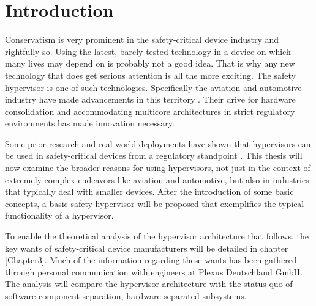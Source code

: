
\chapter{Introduction} %

\label{Chapter1} %


\newcommand{\keyword}[1]{\textbf{#1}}
\newcommand{\bold}[1]{\textbf{#1}}
\newcommand{\tabhead}[1]{\textbf{#1}}
\newcommand{\code}[1]{\texttt{#1}}
\newcommand{\file}[1]{\texttt{\bfseries#1}}
\newcommand{\option}[1]{\texttt{\itshape#1}}

\newcommand{\mfg}{manufacturer}

Conservatism is very prominent in the safety-critical device industry and rightfully so. Using the latest, barely tested technology in a device on which many lives may depend on is probably not a good idea. That is why any new technology that does get serious attention is all the more exciting. The safety hypervisor is one of such technologies. Specifically the aviation and automotive industry have made advancements in this territory \cite{reinhardt2014embedded} \cite{vanderleest2015mpsoc}. Their drive for hardware consolidation and accommodating multicore architectures in strict regulatory environments has made innovation necessary.

Some prior research and real-world deployments have shown that hypervisors can be used in safety-critical devices from a regulatory standpoint \cite{larrucea2015modular}.
This thesis will now examine the broader reasons for using hypervisors, not just in the context of extremely complex endeavors like aviation and automotive, but also in industries that typically deal with smaller devices. After the introduction of some basic concepts, a basic safety hypervisor will be proposed that exemplifies the typical functionality of a hypervisor. 

To enable the theoretical analysis of the hypervisor architecture that follows, the key wants of safety-critical device manufacturers will be detailed in chapter \ref{Chapter3}. Much of the information regarding these wants has been gathered through personal communication with engineers at Plexus Deutschland GmbH. The analysis will compare the hypervisor architecture with the status quo of software component separation, hardware separated subsystems.

